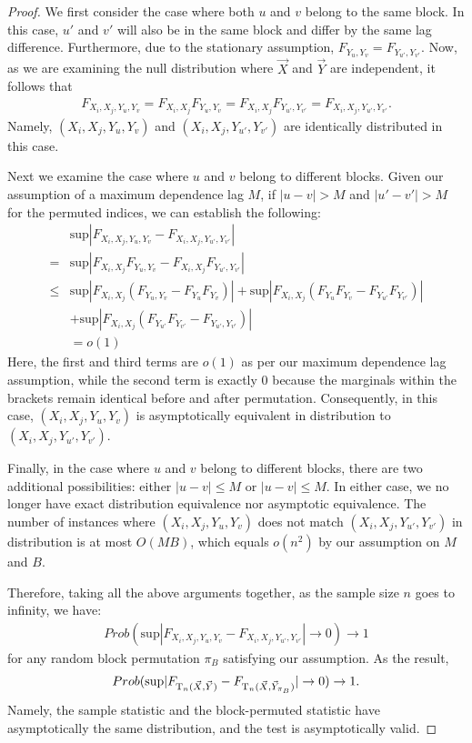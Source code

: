 \begin{proof}
We first consider the case where both $u$ and $v$ belong to the same block. In this case, $u'$ and $v'$ will also be in the same block and differ by the same lag difference. Furthermore, due to the stationary assumption, $F_{Y_u,Y_v} = F_{Y_{u'},Y_{v'}}$. Now, as we are examining the null distribution where $\vec{X}$ and $\vec{Y}$ are independent, it follows that
    \begin{align*}
        F_{X_i,X_j, Y_u,Y_v} = F_{X_i,X_j}F_{Y_u,Y_v} = F_{X_i,X_j}F_{Y_{u'},Y_{v'}} =F_{X_i,X_j, Y_{u'},Y_{v'}}.
    \end{align*}
Namely, $(X_i,X_j, Y_u,Y_v)$ and $(X_i,X_j, Y_{u'},Y_{v'})$ are identically distributed in this case.

Next we examine the case where $u$ and $v$ belong to different blocks. Given our assumption of a maximum dependence lag $M$, if $|u-v| > M$ and $|u'-v'| > M$ for the permuted indices, we can establish the following:
    \begin{align*}
       & \mbox{sup} |F_{X_i,X_j,Y_u,Y_v} - F_{X_i,X_j, Y_{u'},Y_{v'}} |\\
        =& \mbox{sup} |F_{X_i,X_j}F_{Y_u,Y_v} - F_{X_i,X_j} F_{Y_{u'},Y_{v'}} |\\
        \leq & \mbox{sup} |F_{X_i,X_j}(F_{Y_u,Y_v} - F_{Y_{u}}F_{Y_{v}}) |+\mbox{sup} |F_{X_i,X_j}(F_{Y_{u}}F_{Y_{v}} - F_{Y_{u'}}F_{Y_{v'}} )|\\
        &+\mbox{sup} |F_{X_i,X_j}(F_{Y_{u'}}F_{Y_{v'}} - F_{Y_{u'},Y_{v'}})  |\\
        &=o(1)
    \end{align*}
Here, the first and third terms are $o(1)$ as per our maximum dependence lag assumption, while the second term is exactly $0$ because the marginals within the brackets remain identical before and after permutation. Consequently, in this case, $(X_i,X_j, Y_u,Y_v)$ is asymptotically equivalent in distribution to $(X_i,X_j, Y_{u'},Y_{v'})$.

Finally, in the case where $u$ and $v$ belong to different blocks, there are two additional possibilities: either $|u-v| \leq M$ or $|u-v| \leq M$. In either case, we no longer have exact distribution equivalence nor asymptotic equivalence. The number of instances where $(X_i,X_j, Y_u,Y_v)$ does not match $(X_i,X_j, Y_{u'},Y_{v'})$ in distribution is at most $O(MB)$, which equals $o(n^2)$ by our assumption on $M$ and $B$.

Therefore, taking all the above arguments together, as the sample size $n$ goes to infinity, we have:
\begin{align*}
Prob(  \mbox{sup} |F_{X_i,X_j,Y_u,Y_v} - F_{X_i,X_j, Y_{u'},Y_{v'}} | \rightarrow 0) \rightarrow 1
\end{align*}
for any random block permutation $\pi_{B}$ satisfying our assumption. As the result,
\begin{align*}
Prob(  \mbox{sup} |F_{\mathrm{T}_{n}(\vec{X},\vec{Y})} - F_{\mathrm{T}_{n}(\vec{X},\vec{Y}_{\pi_{B}})} | \rightarrow 0) \rightarrow 1.
\end{align*}
Namely, the sample statistic and the block-permuted statistic have asymptotically the same distribution, and the test is asymptotically valid.
\end{proof}

